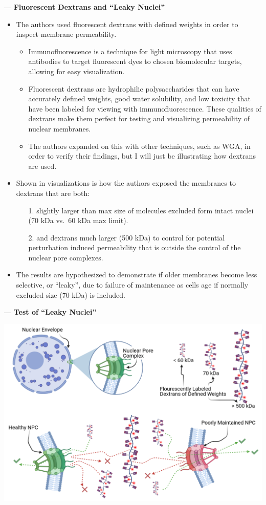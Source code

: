 \documentclass[basic,plain]{inVerba-notes}
\begin{document}
\medskip
{} --- \textbf{Fluorescent Dextrans and ``Leaky Nuclei''}
\begin{itemize}
  \item The authors used fluorescent dextrans with defined weights in order to inspect membrane permeability.
    \begin{itemize}
      \item Immunofluorescence is a technique for light microscopy that uses antibodies to target fluorescent dyes to chosen biomolecular targets, allowing for easy visualization.
      \item Fluorescent dextrans are hydrophilic polysaccharides that can have accurately defined weights, good water solubility, and low toxicity that have been labeled for viewing with immunofluorescence. These qualities of dextrans make them perfect for testing and visualizing permeability of nuclear membranes.
      \item The authors expanded on this with other techniques, such as WGA, in order to verify their findings, but I will just be illustrating how dextrans are used.
    \end{itemize}
  \item Shown in visualizations is how the authors exposed the membranes to dextrans that are both:
    \begin{itemize}
      \item[1.] slightly larger than max size of molecules excluded form intact nuclei (70 kDa vs.\ 60 kDa max limit).
      \item[2.] and dextrans much larger (500 kDa) to control for potential perturbation induced permeability that is outside the control of the nuclear pore complexes.
    \end{itemize}
  \item The results are hypothesized to demonstrate if older membranes become less selective, or ``leaky'', due to failure of maintenance as cells age if normally excluded size (70 kDa) is included.
\end{itemize}

\newpage 

 --- \textbf{Test of ``Leaky Nuclei''}
\bigskip

\begin{center}
  \includegraphics[width=\textwidth]{images/week-3-illustration.png}
\end{center}
\end{document}
